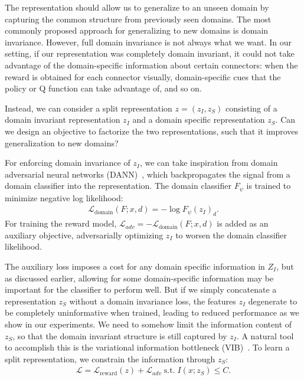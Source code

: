 The representation should allow us to generalize to an unseen domain by capturing the common structure from previously seen domains. The most commonly proposed approach for generalizing to new domains is domain invariance. However, full domain invariance is not always what we want. In our setting, if our representation was completely domain invariant, it could not take advantage of the domain-specific information about certain connectors: when the reward is obtained for each connector visually, domain-specific cues that the policy or Q function can take advantage of, and so on.

Instead, we can consider a split representation $z = (z_I, z_S)$ consisting of a domain invariant representation $z_I$ and a domain specific representation $z_S$. Can we design an objective to factorize the two representations, such that it improves generalization to new domains?

For enforcing domain invariance of $z_I$, we can take inspiration from domain adversarial neural networks (DANN)~\cite{ganin2016domainadversarial}, which backpropagates the signal from a domain classifier into the representation. The domain classifier $F_\psi$ is trained to minimize negative log likelihood:
\begin{eqnarray}
\mathcal{L}_\text{domain}(F; x, d) = -\log F_\psi(z_I)_d.
\end{eqnarray}
For training the reward model, $\mathcal{L}_{adv} = -\mathcal{L}_\text{domain}(F; x, d)$ is added as an auxiliary objective, adversarially optimizing $z_I$ to worsen the domain classifier likelihood.

The auxiliary loss imposes a cost for any domain specific information in $Z_I$, but as discussed earlier, allowing for some domain-specific information may be important for the classifier to perform well. But if we simply concatenate a representation $z_S$ without a domain invariance loss, the features $z_I$ degenerate to be completely uninformative when trained, leading to reduced performance as we show in our experiments. We need to somehow limit the information content of $z_S$, so that the domain invariant structure is still captured by $z_I$. A natural tool to accomplish this is the variational information bottleneck (VIB)~\cite{alemi2017vib}. To learn a split representation, we constrain the information through $z_S$:
\begin{eqnarray}
\mathcal{L} = \mathcal{L}_{\text{reward}}(z) + \mathcal{L}_{adv} \; \text{s.t.} \; I(x; z_S) \leq C.
\end{eqnarray}

